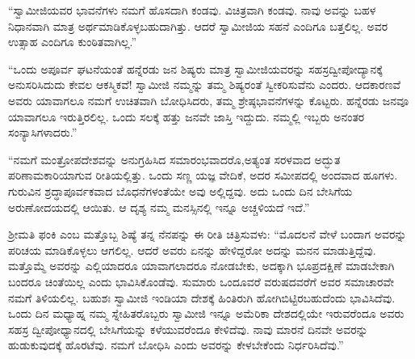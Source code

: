  “ಸ್ವಾಮೀಜಿಯವರ ಭಾವನೆಗಳು ನಮಗೆ ಹೊಸದಾಗಿ ಕಂಡವು. ವಿಚಿತ್ರವಾಗಿ ಕಂಡವು. ನಾವು ಅವನ್ನು ಬಹಳ ನಿಧಾನವಾಗಿ ಮಾತ್ರ ಅರ್ಥಮಾಡಿಕೊಳ್ಳಬಹುದಾಗಿತ್ತು. ಆದರೆ ಸ್ವಾಮೀಜಿಯ ಸಹನೆ ಎಂದಿಗೂ ಬತ್ತಲಿಲ್ಲ. ಅವರ ಉತ್ಸಾಹ ಎಂದಿಗೂ ಕುಂಠಿತವಾಗಿಲ್ಲ.” 

 “ಒಂದು ಅಪೂರ್ವ ಘಟನೆಯಂತೆ ಹನ್ನೆರಡು ಜನ ಶಿಷ್ಯರು ಮಾತ್ರ ಸ್ವಾಮೀಜಿಯವರನ್ನು ಸಹಸ್ರದ್ವೀಪೋದ್ಯಾನಕ್ಕೆ ಅನುಸರಿಸಿದುದು ಕೇವಲ ಆಕಸ್ಮಿಕವೆ! ಸ್ವಾಮೀಜಿ ನಮ್ಮನ್ನು ತಮ್ಮ ಶಿಷ್ಯರಂತೆ ಸ್ವೀಕರಿಸುವೆನು ಎಂದರು. ಆದಕಾರಣವೆ ಅವರು ಯಾವಾಗಲೂ ನಮಗೆ ಉಚಿತವಾಗಿ ಬೋಧಿಸಿದರು, ತಮ್ಮ ಶ್ರೇಷ್ಠಭಾವನೆಗಳನ್ನು ಕೊಟ್ಟರು. ಹನ್ನೆರಡು ಜನವೂ ಯಾವಾಗಲೂ ಇರುತ್ತಿರಲಿಲ್ಲ. ಒಂದು ಸಲಕ್ಕೆ ಹತ್ತು ಜನವೇ ಜಾಸ್ತಿ ಇದ್ದುದು. ನಮ್ಮಲ್ಲಿ ಇಬ್ಬರು ಅನಂತರ ಸಂನ್ಯಾಸಿಗಳಾದರು.” 

 “ನಮಗೆ ಮಂತ್ರೋಪದೇಶವನ್ನು ಅನುಗ್ರಹಿಸಿದ ಸಮಾರಂಭವಾದರೊ,\break ಅತ್ಯಂತ ಸರಳವಾದ ಅದ್ಭುತ ಪರಿಣಾಮಕಾರಿಯಾಗುವ ರೀತಿಯಲ್ಲಿತ್ತು. ಒಂದು ಸಣ್ಣ ಯಜ್ಞ ವೇದಿಕೆ, ಅದರ ಸಮೀಪದಲ್ಲಿ ಅಂದವಾದ ಹೂಗಳು. ಗುರುವಿನ ಶ್ರದ್ಧಾಪೂರ್ವಕವಾದ ಬೊಧನೆಗಳಂತೆಯೇ ಅವು ಅಲ್ಲಿದ್ದವು. ಅದು ಒಂದು ದಿನ ಬೇಸಿಗೆಯ ಅರುಣೋದಯದಲ್ಲಿ ಆಯಿತು. ಆ ದೃಶ್ಯ ನಮ್ಮ ಮನಸ್ಸಿನಲ್ಲಿ ಇನ್ನೂ ಅಚ್ಚಳಿಯದೆ ಇದೆ.” 

 ಶ‍್ರೀಮತಿ ಫಂಕಿ ಎಂಬ ಮತ್ತೊಬ್ಬ ಶಿಷ್ಯೆ ತನ್ನ ನೆನಪನ್ನು ಈ ರೀತಿ ಚಿತ್ರಿಸುವಳು: “ಮೊದಲನೆ ವೇಳೆ ಬಂದಾಗ ಅವರನ್ನು ಪರಿಚಯ ಮಾಡಿಕೊಳ್ಳಲು ಆಗಲಿಲ್ಲ. ಆದರೆ ಅವರು ಏನನ್ನು ಹೇಳಿದ್ದರೋ ಅದನ್ನು ಮನನ ಮಾಡುತ್ತಿದ್ದೆವು. ಮತ್ತೊಮ್ಮೆ ಅವರನ್ನು ಎಲ್ಲಿಯಾದರೂ ಯಾವಾಗಲಾದರೂ ನೋಡಬೇಕು, ಅದಕ್ಕಾಗಿ ಭೂಪ್ರದಕ್ಷಿಣೆ ಮಾಡಬೇಕಾಗಿ ಬಂದರೂ ಚಿಂತೆಯಿಲ್ಲ ಎಂದು ಭಾವಿಸಿಕೊಂಡೆವು. ಸುಮಾರು ಒಂದೂವರೆ ವರುಷದವರೆಗೆ ಅವರ ಸಮಾಚಾರವೇ ನಮಗೆ ತಿಳಿಯಲಿಲ್ಲ. ಬಹುಶಃ ಸ್ವಾಮೀಜಿ ಇಂಡಿಯಾ ದೇಶಕ್ಕೆ ಹಿಂತಿರುಗಿ ಹೋಗಿಬಿಟ್ಟಿರಬಹುದೆಂದು ಭಾವಿಸಿದೆವು. ಒಂದು ದಿನ ಮಧ್ಯಾಹ್ನ ನಮ್ಮ ಸ್ನೇಹಿತರೊಬ್ಬರು ಸ್ವಾಮೀಜಿ ಇನ್ನೂ ಅಮೆರಿಕಾ ದೇಶದಲ್ಲಿಯೇ ಇರುವರೆಂದೂ ಅವರು ಸಹಸ್ರ ದ್ವೀಪೋಧ್ಯಾನದಲ್ಲಿ ಬೇಸಿಗೆಯನ್ನು ಕಳೆಯುವರೆಂದೂ ಕೇಳಿದೆವು. ನಾವು ಮಾರನೆ ದಿನವೇ ಅವರನ್ನು ಹುಡುಕುವುದಕ್ಕೆ ಹೊರಟೆವು. ನಮಗೆ ಬೋಧಿಸಿ ಎಂದು ಅವರನ್ನು ಕೇಳಬೇಕೆಂದು ನಿರ್ಧರಿಸಿದೆವು.” 

